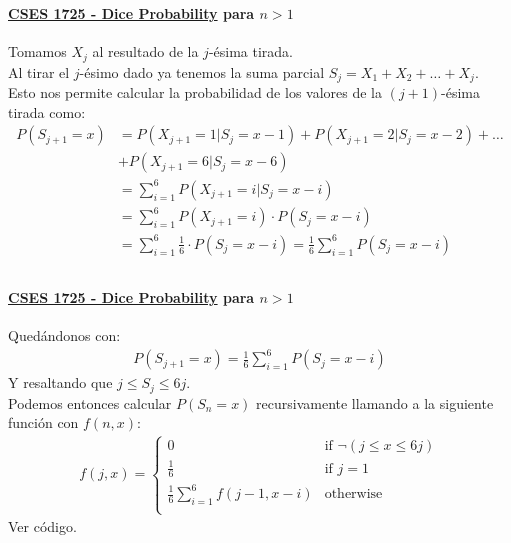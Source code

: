 \documentclass{beamer}
\begin{document}
\begin{frame}
  \frametitle{\SECTIONB}
  \framesubtitle{\href{https://cses.fi/problemset/task/1725/}{CSES 1725 - Dice Probability} para \(n > 1\)}

  Tomamos \(X_{j}\) al resultado de la \(j\)-ésima tirada. \\
  Al tirar el \(j\)-ésimo dado ya tenemos la suma parcial \(S_{j} = X_{1} + X_{2} + \ldots + X_{j}\). \pause \\
  Esto nos permite calcular la probabilidad de los valores de la \((j+1)\)-ésima tirada como:
  {\small
  \begin{align*}
    P(S_{j+1} = x) &= P(X_{j+1} = 1 | S_{j} = x - 1) + P(X_{j+1} = 2 | S_{j} = x - 2) + \ldots \\
                  & + P(X_{j+1} = 6 | S_{j} = x - 6)  \\
                  &= \sum_{i = 1}^{6}P(X_{j+1} = i | S_{j} = x - i) \\
                  &= \sum_{i = 1}^{6}P(X_{j+1} = i) \cdot P(S_{j} = x - i) \\
                  &= \sum_{i = 1}^{6}\frac{1}{6} \cdot P(S_{j} = x - i) = \frac{1}{6}\sum_{i = 1}^{6}P(S_{j} = x - i) \\
  \end{align*}
  }%
\end{frame}

\begin{frame}
  \frametitle{\SECTIONB}
  \framesubtitle{\href{https://cses.fi/problemset/task/1725/}{CSES 1725 - Dice Probability} para \(n > 1\)}

  Quedándonos con:
  \begin{gather*}
    P(S_{j+1} = x) = \frac{1}{6}\sum_{i = 1}^{6}P(S_{j} = x - i)
  \end{gather*}
  Y resaltando que \(j \leq S_{j} \leq 6j\). \\
  Podemos entonces calcular \(P(S_{n} = x)\) recursivamente llamando a la siguiente función con \(f(n, x)\):
  \begin{gather*}
    f(j, x) = \begin{cases}
      0 & \text{if } \neg(j \leq x \leq 6j) \\
      \frac{1}{6} & \text{if } j = 1 \\
      \frac{1}{6}\sum_{i = 1}^{6}f(j-1, x-i) & \text{otherwise} \\
    \end{cases}
  \end{gather*} \pause
  Ver código.
\end{frame}
\end{document}
